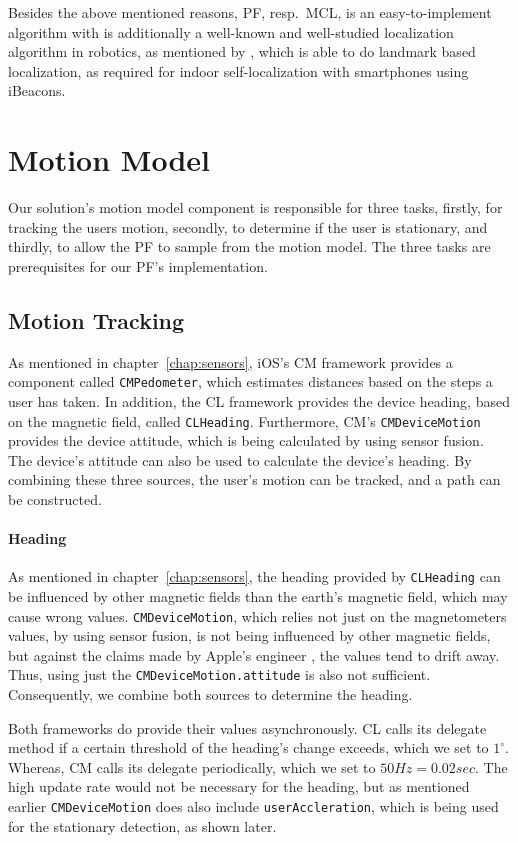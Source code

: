 Besides the above mentioned reasons, \acl{PF}, resp.\ \acs{MCL}, is an easy-to-implement algorithm with is additionally a well-known and well-studied localization algorithm in robotics, as mentioned by \citet{thrun:prob_robo}, which is able to do landmark based localization, as required for indoor self-localization with smartphones using iBeacons.

\section{Motion Model}\label{sec:algo_motion_model}
Our solution's motion model component is responsible for three tasks, firstly, for tracking the users motion, secondly, to determine if the user is stationary, and thirdly, to allow the \acs{PF} to sample from the motion model. The three tasks are prerequisites for our \acs{PF}'s implementation.

\subsection{Motion Tracking}
As mentioned in chapter~\ref{chap:sensors}, iOS's \ac{CM} framework provides a component called \texttt{CMPedometer}, which estimates distances based on the steps a user has taken. In addition, the \ac{CL} framework provides the device heading, based on the magnetic field, called \texttt{CLHeading}. Furthermore, \ac{CM}'s \texttt{CMDeviceMotion} provides the device attitude, which is being calculated by using sensor fusion. The device's attitude can also be used to calculate the device's heading. By combining these three sources, the user's motion can be tracked, and a path can be constructed.

\paragraph{Heading}
As mentioned in chapter~\ref{chap:sensors}, the heading provided by \texttt{CLHeading} can be influenced by other magnetic fields than the earth's magnetic field, which may cause wrong values. \texttt{CMDeviceMotion}, which relies not just on the magnetometers values, by using sensor fusion, is not being influenced by other magnetic fields, but against the claims made by Apple's engineer \citet{apple:wwdc_2012_pham}, the values tend to drift away. Thus, using just the \texttt{CMDeviceMotion.attitude} is also not sufficient. Consequently, we combine both sources to determine the heading.

Both frameworks do provide their values asynchronously. \acs{CL} calls its delegate method if a certain threshold of the heading's change exceeds, which we set to $1^\circ$. Whereas, \acs{CM} calls its delegate periodically, which we set to $50 Hz = 0.02 sec$. The high update rate would not be necessary for the heading, but as mentioned earlier \texttt{CMDeviceMotion} does also include \texttt{userAccleration}, which is being used for the stationary detection, as shown later.

